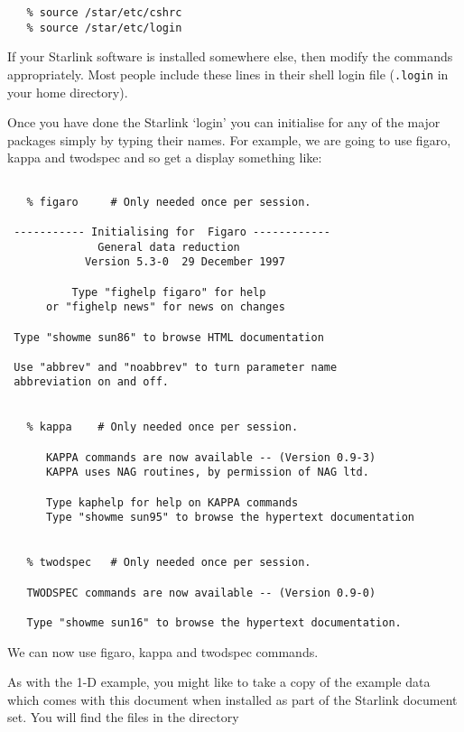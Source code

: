 \documentclass[twoside,11pt]{article}
\newcommand{\xref}[3]{#1}
\newcommand{\scspec}[2]{#1}
\newcommand{\scspec}[2]{#2}
\begin{document}
{
\scspec{\small}{ }
\begin{verbatim}
   % source /star/etc/cshrc
   % source /star/etc/login
\end{verbatim}
}

If your Starlink software is installed somewhere else,
then modify the commands appropriately.
Most people include these lines in their shell login file
(\verb+.login+ in your home directory).

Once you have done the Starlink `login' you can initialise for any of the
major packages simply by typing their names.
For example, we are going to use
\xref{{\sc figaro}}{sun86}{}\cite{figaro}, \xref{{\sc kappa}}{sun95}{}\cite{kappa} and
\xref{{\sc twodspec}}{sun16}{}\cite{twodspec} and so get a display
something like:

{
\scspec{\small}{ }
\begin{verbatim}

   % figaro     # Only needed once per session.
 
 ----------- Initialising for  Figaro ------------
              General data reduction
            Version 5.3-0  29 December 1997
 
          Type "fighelp figaro" for help
      or "fighelp news" for news on changes
 
 Type "showme sun86" to browse HTML documentation
 
 Use "abbrev" and "noabbrev" to turn parameter name
 abbreviation on and off.


   % kappa    # Only needed once per session.

      KAPPA commands are now available -- (Version 0.9-3)
      KAPPA uses NAG routines, by permission of NAG ltd.

      Type kaphelp for help on KAPPA commands
      Type "showme sun95" to browse the hypertext documentation

 
   % twodspec   # Only needed once per session.
 
   TWODSPEC commands are now available -- (Version 0.9-0)
 
   Type "showme sun16" to browse the hypertext documentation.
\end{verbatim}
}

We can now use {\sc figaro}, {\sc kappa} and {\sc twodspec} commands.

As with the 1-D example, you might like to take a copy of the example
data which comes with this document when installed as part of the
Starlink document set. You will find the files in the directory
\end{document}
